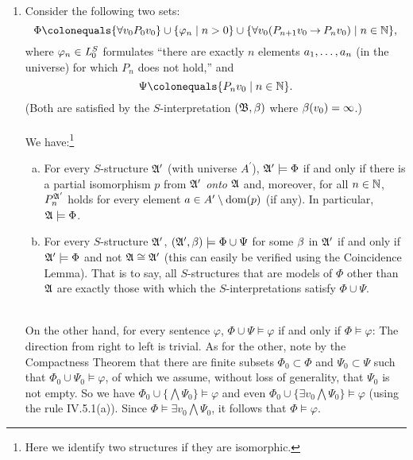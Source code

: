 \begin{enumerate}[1.]
\begin{enumerate}[(1)]
\item Consider the following two sets:
\[
\Phi \colonequals \{ \forall v_0 P_0 v_0 \} \cup \setm{\varphi_n}{n > 0} \cup \setm{\forall v_0 (P_{n + 1} v_0 \limply P_n v_0)}{n \in \nat},
\]
where $\varphi_n \in \fstordlang[0]{S}$ formulates ``there are exactly $n$ elements $\seq[1]{a}{n}$ (in the universe) for which $P_n$ does not hold,'' and
\[
\Psi \colonequals \setm{P_n v_0}{n \in \nat}.
\]
(Both are satisfied by the $S$-interpretation $\intpp{\struct{B}}{\assgn}$ where $\assgn(v_0) = \infty$.)\\
\ \\
We have:\footnote{Here we identify two structures if they are isomorphic.}
\begin{enumerate}[(a)]
\item For every $S$-structure $\struct{A}^\prime$ (with universe $A^\prime$), $\struct{A}^\prime \models \Phi$ if and only if there is a partial isomorphism $p$ from $\struct{A}^\prime$ \emph{onto} $\struct{A}$ and, moreover, for all $n \in \nat$, $P_n^{\struct{A}^\prime}$ holds for every element $a \in A^\prime \setminus \dom{p}$ (if any). In particular, $\struct{A} \models \Phi$.
\item For every $S$-structure $\struct{A}^\prime$, $\intpp{\struct{A}^\prime}{\assgn} \models \Phi \cup \Psi$ for some $\assgn$ in $\struct{A}^\prime$ if and only if $\struct{A}^\prime \models \Phi$ and not $\struct{A} \iso \struct{A}^\prime$ (this can easily be verified using the Coincidence Lemma). That is to say, all $S$-structures that are models of $\Phi$ other than $\struct{A}$ are exactly those with which the $S$-interpretations satisfy $\Phi \cup \Psi$.
\end{enumerate}
\ \\
On the other hand, for every sentence $\varphi$, $\Phi \cup \Psi \models \varphi$ if and only if $\Phi \models \varphi$: The direction from right to left is trivial. As for the other, note by the Compactness Theorem that there are finite subsets $\Phi_0 \subset \Phi$ and $\Psi_0 \subset \Psi$ such that $\Phi_0 \cup \Psi_0 \models \varphi$, of which we assume, without loss of generality, that $\Psi_0$ is not empty. So we have $\Phi_0 \cup \{ \bigwedge\Psi_0 \} \models \varphi$ and even $\Phi_0 \cup  \{ \exists v_0 \bigwedge\Psi_0 \} \models \varphi$ (using the rule IV.5.1(a)). Since $\Phi \models \exists v_0 \bigwedge\Psi_0$, it follows that $\Phi \models \varphi$.
\end{enumerate}
\end{enumerate}
